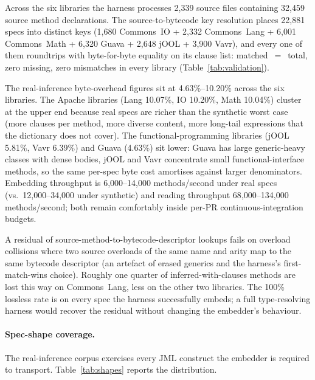 Across the six libraries the harness processes 2{,}339 source files containing 32{,}459 source method declarations. The source-to-bytecode key resolution places 22{,}881 specs into distinct keys (1{,}680 Commons~IO + 2{,}332 Commons~Lang + 6{,}001 Commons~Math + 6{,}320 Guava + 2{,}648 jOOL + 3{,}900 Vavr), and every one of them roundtrips with byte-for-byte equality on its clause list: matched~$=$~total, zero missing, zero mismatches in every library (Table~\ref{tab:validation}).

The real-inference byte-overhead figures sit at 4.63\%--10.20\% across the six libraries. The Apache libraries (Lang 10.07\%, IO 10.20\%, Math 10.04\%) cluster at the upper end because real specs are richer than the synthetic worst case (more clauses per method, more diverse content, more long-tail expressions that the dictionary does not cover). The functional-programming libraries (jOOL 5.81\%, Vavr 6.39\%) and Guava (4.63\%) sit lower: Guava has large generic-heavy classes with dense bodies, jOOL and Vavr concentrate small functional-interface methods, so the same per-spec byte cost amortises against larger denominators. Embedding throughput is 6{,}000--14{,}000 methods/second under real specs (vs.\ 12{,}000--34{,}000 under synthetic) and reading throughput 68{,}000--134{,}000 methods/second; both remain comfortably inside per-PR continuous-integration budgets.

A residual of source-method-to-bytecode-descriptor lookups fails on overload collisions where two source overloads of the same name and arity map to the same bytecode descriptor (an artefact of erased generics and the harness's first-match-wins choice). Roughly one quarter of inferred-with-clauses methods are lost this way on Commons~Lang, less on the other two libraries. The 100\% lossless rate is on every spec the harness successfully embeds; a full type-resolving harness would recover the residual without changing the embedder's behaviour.

\paragraph{Spec-shape coverage.}
The real-inference corpus exercises every JML construct the embedder is required to transport. Table~\ref{tab:shapes} reports the distribution.

